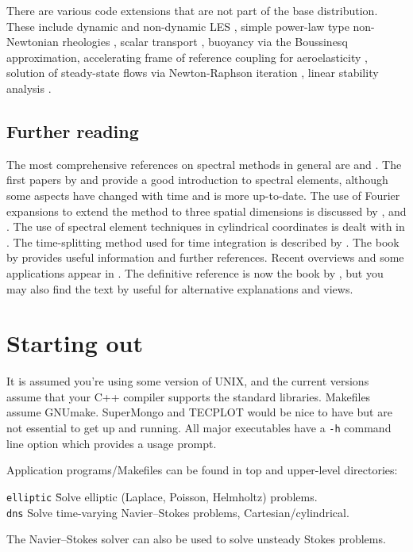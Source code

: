 \documentclass[11pt,a4paper]{report}
\begin{document}
There are various code extensions that are not part of the base
distribution. These include dynamic and non-dynamic LES
\citep{blsc03}, simple power-law type non-Newtonian rheologies
\citep{rb06}, scalar transport \citep{hmb01a,hmb02b}, buoyancy via the
Boussinesq approximation, accelerating frame of reference coupling for
aeroelasticity \citep{bh96a,bh99,bgw01,hmb03}, solution of
steady-state flows via Newton-Raphson iteration \citep{hmb02a}, linear
stability analysis
\citep{hmb02a,bllo03b,bllo03a,bml04,shbl04,ebs06,blsh06}.

\section{Further reading}

The most comprehensive references on spectral methods in general are
\citet{gs77} and \citet{chqz88}.  The first papers by \citet{pat84}
and \citet{kp86} provide a good introduction to spectral elements,
although some aspects have changed with time and \citet{mt89} is more
up-to-date.  The use of Fourier expansions to extend the method to
three spatial dimensions is discussed by \citet{ap89}, \citet{kar89}
and \citet{kar90}.  The use of spectral element techniques in
cylindrical coordinates is dealt with in \citet{blsh04}.  The
time-splitting method used for time integration is described by
\citet*{kio91}.  The book by \citet{fun97} provides useful information
and further references.  Recent overviews and some applications appear
in \citet{kh98,hen99b}.  The definitive reference is now the book by
\citet{kars05}, but you may also find the text by \citet*{dfm02}
useful for alternative explanations and views.

\chapter{Starting out}

It is assumed you're using some version of UNIX, and the current
versions assume that your C++ compiler supports the standard
libraries. Makefiles assume GNUmake.  SuperMongo and TECPLOT would be
nice to have but are not essential to get up and running.  All major
executables have a \texttt{-h} command line option which provides a
usage prompt.

Application programs/Makefiles can be found in top and upper-level
directories:
\begin{tabbing}
\texttt{elliptic}    \= 
        Solve elliptic (Laplace, Poisson, Helmholtz) problems.\\
\texttt{dns} \>
        Solve time-varying Navier--Stokes problems, Cartesian/cylindrical.\\
\end{tabbing}
The Navier--Stokes solver can also be used to solve unsteady Stokes
problems.
\end{document}

